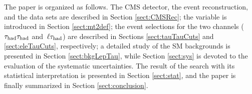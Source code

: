 The paper is organized as follows.  The CMS detector, the event reconstruction, and the data sets are described
in Section \ref{sect:CMSRec}; the \mttwo variable is introduced in Section \ref{sect:mt2def}; 
the event selections for the two channels ($\tau_{\rm had} \tau_{\rm had}$ and $\,\ell\tau_{\rm had}$)
are described in Sections \ref{sect:tauTauCuts} and \ref{sect:eleTauCuts}, respectively;
a detailed study of the SM backgrounds is presented in Section \ref{sect:bkgLepTau}, while Section \ref{sect:sys} 
is devoted to the evaluation of the systematic uncertainties.  The result of the search with its statistical interpretation is presented in 
Section \ref{sect:stat}, and the paper is finally summarized in Section \ref{sect:conclusion}.





